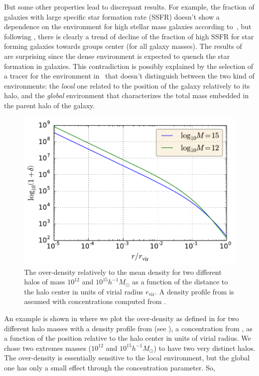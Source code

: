 But some other properties lead to discrepant results. For example, the fraction
of galaxies with large specific star formation rate (SSFR) doesn't show a
dependence on the environment for high stellar mass galaxies according
to~\cite{Peng+10}, but following \citet{vonderLinden+10}, there is clearly a
trend of decline of the fraction of high SSFR for star forming galaxies towards
groups center (for all galaxy masses). The results of~\cite{Peng+10} are
surprising since the dense environment is expected to quench the star formation
in galaxies. This contradiction is possibly explained by the selection of a
tracer for the environment in~\cite{Peng+10} that doesn't distinguish between
the two kind of environments: the \emph{local} one related to the position of
the galaxy relatively to its halo, and the \emph{global} environment that
characterizes the total mass embedded in the parent halo of the galaxy.
%
\begin{figure}[htb]
    \centering
    \includegraphics[width=0.6\linewidth]{figures/introduction/overdensity.pdf}
    \caption{The over-density relatively to the mean density for two different
        halos of mass $10^{12}$ and $10^{15} h^{-1} M_\odot$ as a function of
        the distance to the halo center in units of virial radius
        $r_\mathrm{vir}$. A density profile from \citet{NFW+97} is assumed with
        concentrations computed from \citet{Maccio+08}.\label{fig:overdensity}}
\end{figure}
%
An example is shown in  where we plot the
over-density as defined in \citet{Peng+10} for two different halo masses with a
density profile from \citet{NFW+97} (see ), a
concentration from \citet{Maccio+08}, as a function of the position relative to
the halo center in units of virial radius. We chose two extremes masses
($10^{12}$ and $10^{15} h^{-1} M_\odot$) to have two very distinct halos. The
over-density is essentially sensitive to the local environment, but the global
one has only a small effect through the concentration parameter. So,
